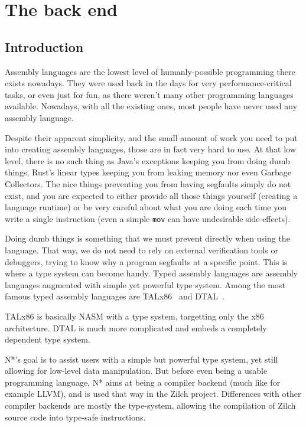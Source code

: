 \part{The back end}\label{part:nstar}


\chapter{Introduction}\label{chap:nstar-abstract}

Assembly languages are the lowest level of humanly-possible programming there exists nowadays. They were used back in the days for very performance-critical tasks, or even just for fun, as there weren't many other programming languages available. Nowadays, with all the existing ones, most people have never used any assembly language.

Despite their apparent simplicity, and the small amount of work you need to put into creating assembly languages, those are in fact very hard to use. At that low level, there is no such thing as Java's exceptions keeping you from doing dumb things, Rust's linear types keeping you from leaking memory nor even Garbage Collectors. The nice things preventing you from having segfaults simply do not exist, and you are expected to either provide all those things yourself (creating a language runtime) or be very careful about what you are doing each time you write a single instruction (even a simple \texttt{mov} can have undesirable side-effects).

Doing dumb things is something that we must prevent directly when using the language. That way, we do not need to rely on external verification tools or debuggers, trying to know why a program segfaults at a specific point.
This is where a type system can become handy. Typed assembly languages are assembly languages augmented with simple yet powerful type system. Among the most famous typed assembly languages are TALx86~\cite{TALx86} and DTAL~\cite{DTAL}.

TALx86 is basically NASM with a type system, targetting only the x86 architecture. DTAL is much more complicated and embeds a completely dependent type system.

\vspace{\baselineskip}

N*'s goal is to assist users with a simple but powerful type system, yet still allowing for low-level data manipulation.
But before even being a usable programming language, N* aims at being a compiler backend (much like for example LLVM), and is used that way in the Zilch project. Differences with other compiler backends are mostly the type-system, allowing the compilation of Zilch source code into type-safe instructions.

